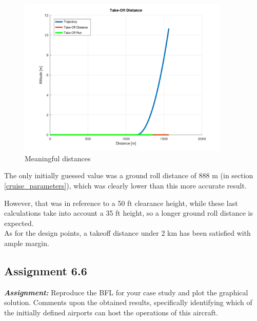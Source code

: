 \documentclass{article}
\begin{document}
\begin{figure}[h!]
    \centering
    \includegraphics[width=0.9\textwidth]{Sources/Plots_and_Pictures/Distances.png}
    \caption{Meaningful distances}
    \label{distances}
\end{figure}

The only initially guessed value was a ground roll distance of 888 m (in section \ref{cruise_parameters}), which was clearly lower than this more accurate result.

However, that was in reference to a 50 ft clearance height, while these last calculations take into account a 35 ft height, so a longer
ground roll distance is expected. \\ 

As for the design points, a takeoff distance under 2 km has been satisfied with ample margin.



\clearpage






\subsection{Assignment 6.6\label{Assignment_6.6}}

\textbf{\textit{Assignment:}} Reproduce the BFL for your case study and plot the graphical solution. 
Comments upon the obtained results, specifically identifying which of the initially 
defined airports can host the operations of this aircraft. \\ \\ \\ 
\end{document}

